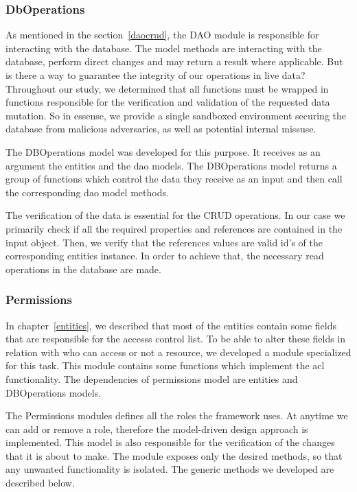 \subsubsection{DbOperations}
As mentioned in the section~\ref{daocrud}, the DAO module is responsible for interacting with the database. The model methods are interacting with the database, perform direct changes and may return a result where applicable. But is there a way to guarantee the integrity of our operations in live data? Throughout our study, we determined that all functions must be wrapped in functions responsible for the verification and validation of the requested data mutation. So in essense, we provide a single sandboxed environment securing the database from malicious adversaries, as well as potential internal missuse. \par 
	The DBOperations model was developed for this purpose. It receives as an argument the entities and the dao models. The DBOperations model returns a group of functions which control the data they receive as an input and then call the corresponding dao model methods. \par 
	The verification of the data is essential for the CRUD operations. In our case we primarily check if all the required properties and references are contained in the input object. Then, we verify that the references values are valid id's of the corresponding entities instance. In order to achieve that, the necessary read operations in the database are made.
	
\subsubsection{Permissions}
In chapter~\ref{entities}, we described that most of the entities contain some fields that are responsible for the accesss control list. To be able to alter these fields in relation with who can access or not a resource, we developed a module specialized for this task. This module contains some functions which implement the acl functionality. The dependencies of permissions model are entities and DBOperations models. \par 
	The Permissions modules defines all the roles the framework uses. At anytime we can add or remove a role, therefore the model-driven design approach is implemented. This model is also responsible for the verification of the changes that it is about to make. The module exposes only the desired methods, so that any unwanted functionality is isolated. The generic methods we developed are described below. 

